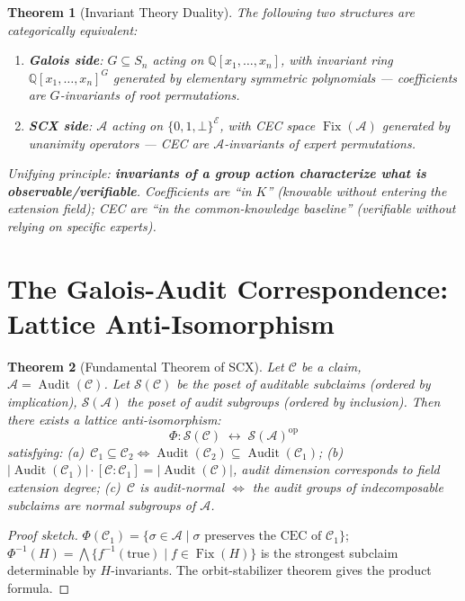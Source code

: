 \documentclass[10pt,a4paper]{article}
\newtheorem{theorem}{Theorem}[section]
\theoremstyle{remark}
\DeclareMathOperator{\Audit}{Audit}
\DeclareMathOperator{\Fix}{Fix}
\newcommand{\Q}{\mathbb{Q}}
\newcommand{\A}{\mathcal{A}}
\newcommand{\E}{\mathcal{E}}
\newcommand{\cC}{\mathcal{C}}
\newcommand{\sS}{\mathcal{S}}
\newcommand{\abs}[1]{\lvert#1\rvert}
\begin{document}
\begin{theorem}[Invariant Theory Duality]\label{thm:invariant}
The following two structures are categorically equivalent:
\begin{enumerate}[label=(\roman*)]
  \item \textbf{Galois side}: $G\subseteq S_n$ acting on $\Q[x_1,\ldots,x_n]$, with invariant ring $\Q[x_1,\ldots,x_n]^G$ generated by elementary symmetric polynomials --- coefficients are $G$-invariants of root permutations.
  \item \textbf{SCX side}: $\A$ acting on $\{0,1,\bot\}^{\E}$, with CEC space $\Fix(\A)$ generated by unanimity operators --- CEC are $\A$-invariants of expert permutations.
\end{enumerate}
Unifying principle: \textbf{invariants of a group action characterize what is observable/verifiable}. Coefficients are ``in $K$'' (knowable without entering the extension field); CEC are ``in the common-knowledge baseline'' (verifiable without relying on specific experts).
\end{theorem}

\section{The Galois-Audit Correspondence: Lattice Anti-Isomorphism}

\begin{theorem}[Fundamental Theorem of SCX]\label{thm:fundamental}
Let $\cC$ be a claim, $\A=\Audit(\cC)$. Let $\sS(\cC)$ be the poset of auditable subclaims (ordered by implication), $\sS(\A)$ the poset of audit subgroups (ordered by inclusion). Then there exists a lattice anti-isomorphism:
\begin{equation}
\Phi: \sS(\cC) \;\longleftrightarrow\; \sS(\A)^{\mathrm{op}}
\end{equation}
satisfying: (a)~$\cC_1\subseteq\cC_2 \iff \Audit(\cC_2)\subseteq\Audit(\cC_1)$; (b)~$\abs{\Audit(\cC_1)}\cdot[\cC:\cC_1]=\abs{\Audit(\cC)}$, audit dimension corresponds to field extension degree; (c)~$\cC$ is audit-normal $\iff$ the audit groups of indecomposable subclaims are normal subgroups of $\A$.
\end{theorem}

\begin{proof}[Proof sketch]
$\Phi(\cC_1)=\{\sigma\in\A\mid\sigma\text{ preserves the CEC of }\cC_1\}$; $\Phi^{-1}(H)=\bigwedge\{f^{-1}(\text{true})\mid f\in\Fix(H)\}$ is the strongest subclaim determinable by $H$-invariants. The orbit-stabilizer theorem gives the product formula.
\end{proof}
\end{document}
